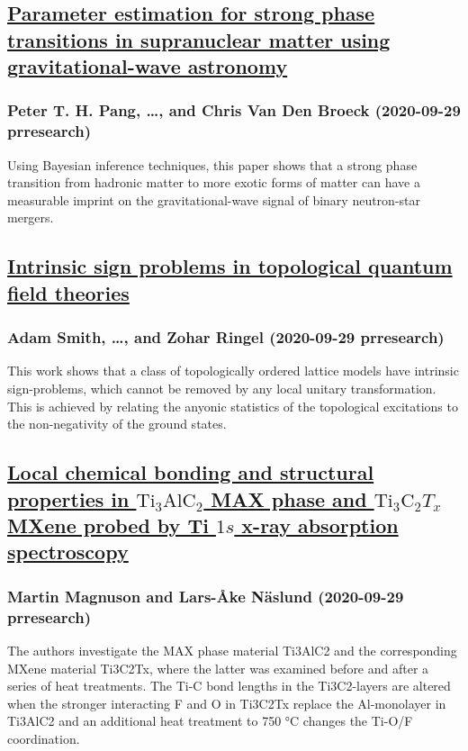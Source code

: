 \subsection*{\href{http://link.aps.org/doi/10.1103/PhysRevResearch.2.033514}{Parameter estimation for strong phase transitions in supranuclear matter using gravitational-wave astronomy}}
\subsubsection*{Peter T. H. Pang, \dots, and Chris Van Den Broeck (2020-09-29 prresearch)}
Using Bayesian inference techniques, this paper shows that a strong phase transition from hadronic matter to more exotic forms of matter can have a measurable imprint on the gravitational-wave signal of binary neutron-star mergers.
\subsection*{\href{http://link.aps.org/doi/10.1103/PhysRevResearch.2.033515}{Intrinsic sign problems in topological quantum field theories}}
\subsubsection*{Adam Smith, \dots, and Zohar Ringel (2020-09-29 prresearch)}
This work shows that a class of topologically ordered lattice models have intrinsic sign-problems, which cannot be removed by any local unitary transformation. This is achieved by relating the anyonic statistics of the topological excitations to the non-negativity of the ground states.
\subsection*{\href{http://link.aps.org/doi/10.1103/PhysRevResearch.2.033516}{Local chemical bonding and structural properties in ${\mathrm{Ti}}_{3}\mathrm{Al}{\mathrm{C}}_{2}$ MAX phase and ${\mathrm{Ti}}_{3}{\mathrm{C}}_{2}{T}_{x}$ MXene probed by Ti $1s$ x-ray absorption spectroscopy}}
\subsubsection*{Martin Magnuson and Lars-Åke Näslund (2020-09-29 prresearch)}
The authors investigate the MAX phase material Ti3AlC2 and the corresponding MXene material Ti3C2Tx, where the latter was examined before and after a series of heat treatments. The Ti-C bond lengths in the Ti3C2-layers are altered when the stronger interacting F and O in Ti3C2Tx replace the Al-monolayer in Ti3AlC2 and an additional heat treatment to 750 °C changes the Ti-O/F coordination.
